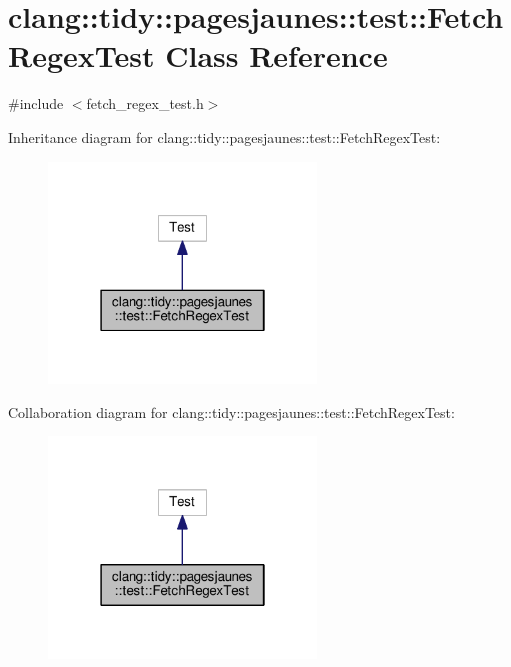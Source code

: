 \hypertarget{classclang_1_1tidy_1_1pagesjaunes_1_1test_1_1_fetch_regex_test}{}\section{clang\+:\+:tidy\+:\+:pagesjaunes\+:\+:test\+:\+:Fetch\+Regex\+Test Class Reference}
\label{classclang_1_1tidy_1_1pagesjaunes_1_1test_1_1_fetch_regex_test}


{\ttfamily \#include $<$fetch\+\_\+regex\+\_\+test.\+h$>$}



Inheritance diagram for clang\+:\+:tidy\+:\+:pagesjaunes\+:\+:test\+:\+:Fetch\+Regex\+Test\+:
\nopagebreak
\begin{figure}[H]
\begin{center}
\leavevmode
\includegraphics[width=202pt]{classclang_1_1tidy_1_1pagesjaunes_1_1test_1_1_fetch_regex_test__inherit__graph}
\end{center}
\end{figure}


Collaboration diagram for clang\+:\+:tidy\+:\+:pagesjaunes\+:\+:test\+:\+:Fetch\+Regex\+Test\+:
\nopagebreak
\begin{figure}[H]
\begin{center}
\leavevmode
\includegraphics[width=202pt]{classclang_1_1tidy_1_1pagesjaunes_1_1test_1_1_fetch_regex_test__coll__graph}
\end{center}
\end{figure}
